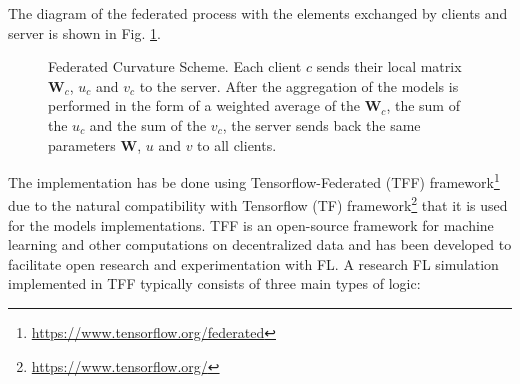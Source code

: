 The diagram of the federated process with the elements exchanged by clients and server is shown in Fig. \ref{fig:fedcurv}.

\begin{figure}[H]
\centering
{}
\caption{Federated Curvature Scheme. Each client $c$ sends their local matrix $\textbf{W}_c$, $u_c$ and $v_c$ to the server. After the aggregation of the models is performed in the form of a weighted average of the $\textbf{W}_c$, the sum of the $u_c$ and the sum of the $v_c$, the server sends back the same parameters $\textbf{W}$, $u$ and $v$ to all clients.\\}
\label{fig:fedcurv}
\end{figure}


The implementation has be done using Tensorflow-Federated (TFF) framework\footnote{\url{https://www.tensorflow.org/federated}} due to the natural compatibility with Tensorflow (TF) framework\footnote{\url{https://www.tensorflow.org/}} that it is used for the models implementations. TFF is an open-source framework for machine learning and other computations on decentralized data and has been developed to facilitate open research and experimentation with FL. A research FL simulation implemented in TFF typically consists of three main types of logic:

